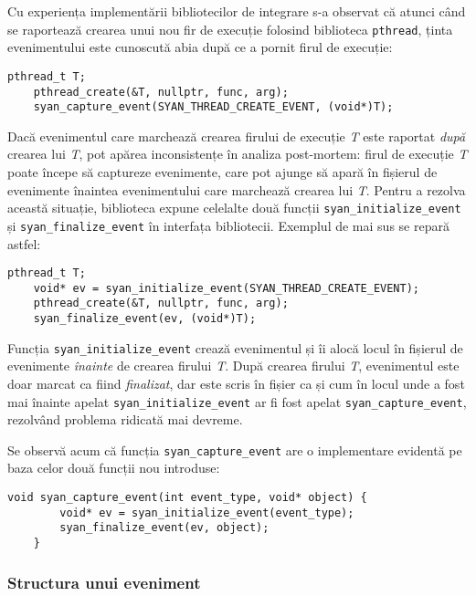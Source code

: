 Cu experiența implementării bibliotecilor de integrare s-a observat că
atunci când se raportează crearea unui nou fir de execuție folosind
biblioteca \lstinline{pthread}, ținta evenimentului este cunoscută abia
după ce a pornit firul de execuție:
\begin{lstlisting}[caption=Capturare incorectă a creării unui fir de
                           execuție]
    pthread_t T;
    pthread_create(&T, nullptr, func, arg);
    syan_capture_event(SYAN_THREAD_CREATE_EVENT, (void*)T);
\end{lstlisting}
Dacă evenimentul care marchează crearea firului de execuție \textit{T}
este raportat \textit{după} crearea lui \textit{T}, pot apărea
inconsistențe în analiza post-mortem: firul de execuție \textit{T} poate
începe să captureze evenimente, care pot ajunge să apară în fișierul de
evenimente înaintea evenimentului care marchează crearea lui \textit{T}.
Pentru a rezolva această situație, biblioteca expune celelalte două
funcții \lstinline{syan_initialize_event} și
\lstinline{syan_finalize_event} în interfața bibliotecii. Exemplul de
mai sus se repară astfel:
\begin{lstlisting}[caption=Capturare corectă a creării unui fir de
                           execuție]
    pthread_t T;
    void* ev = syan_initialize_event(SYAN_THREAD_CREATE_EVENT);
    pthread_create(&T, nullptr, func, arg);
    syan_finalize_event(ev, (void*)T);
\end{lstlisting}
Funcția \lstinline{syan_initialize_event} crează evenimentul și îi
alocă locul în fișierul de evenimente \textit{înainte} de crearea
firului \textit{T}. După crearea firului \textit{T}, evenimentul este
doar marcat ca fiind \textit{finalizat}, dar este scris în fișier ca și
cum în locul unde a fost mai înainte apelat
\lstinline{syan_initialize_event} ar fi fost apelat
\lstinline{syan_capture_event}, rezolvând problema ridicată mai devreme.

Se observă acum că funcția \lstinline{syan_capture_event} are o
implementare evidentă pe baza celor două funcții nou introduse:
\begin{lstlisting}[caption=Implementarea funcției
                   \lstinline{syan_capture_event}]
    void syan_capture_event(int event_type, void* object) {
        void* ev = syan_initialize_event(event_type);
        syan_finalize_event(ev, object);
    }
\end{lstlisting}

\subsubsection{Structura unui eveniment}\label{section:event-structure}

